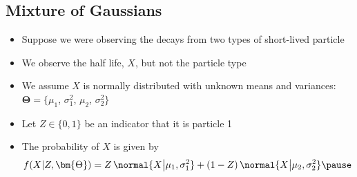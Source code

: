 
\begin{slide}
\section{Mixture of Gaussians}

\begin{PauseHighLight}
  \begin{itemize}
  \item Suppose we were observing the decays from two types of
    short-lived particle\pause
  \item We observe the half life, $X$, but not the particle type\pause
  \item We assume $X$ is normally distributed with unknown means and
    variances: $\bm{\Theta} = \{\mu_1$, $\sigma_1^2$, $\mu_2$,
    $\sigma_2^2\}$\pause
  \item Let $Z\in\{0,1\}$ be an indicator that it is particle 1\pause
  \item The probability of $X$ is given by
    \begin{align*}
      f(X|Z,\bm{\Theta}) = Z\,\normal{X\big|\mu_1,\sigma_1^2} +
      (1-Z)\,\normal{X\big|\mu_2,\sigma_2^2}\pause
    \end{align*}
  \end{itemize}
\end{PauseHighLight}

\end{slide}



